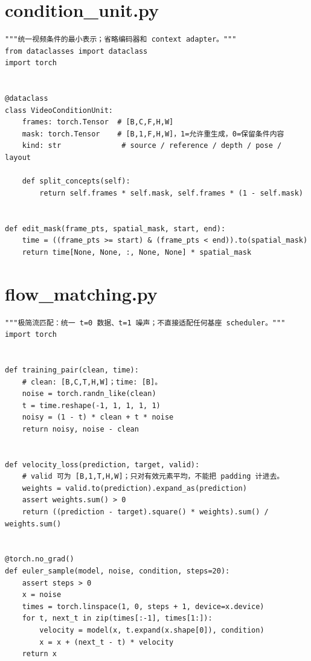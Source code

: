 \section{condition\_unit.py}
\label{code-condition-unit}
\begin{verbatim}
"""统一视频条件的最小表示；省略编码器和 context adapter。"""
from dataclasses import dataclass
import torch


@dataclass
class VideoConditionUnit:
    frames: torch.Tensor  # [B,C,F,H,W]
    mask: torch.Tensor    # [B,1,F,H,W]，1=允许重生成，0=保留条件内容
    kind: str              # source / reference / depth / pose / layout

    def split_concepts(self):
        return self.frames * self.mask, self.frames * (1 - self.mask)


def edit_mask(frame_pts, spatial_mask, start, end):
    time = ((frame_pts >= start) & (frame_pts < end)).to(spatial_mask)
    return time[None, None, :, None, None] * spatial_mask
\end{verbatim}

\section{flow\_matching.py}
\label{code-flow-matching}
\begin{verbatim}
"""极简流匹配：统一 t=0 数据、t=1 噪声；不直接适配任何基座 scheduler。"""
import torch


def training_pair(clean, time):
    # clean: [B,C,T,H,W]；time: [B]。
    noise = torch.randn_like(clean)
    t = time.reshape(-1, 1, 1, 1, 1)
    noisy = (1 - t) * clean + t * noise
    return noisy, noise - clean


def velocity_loss(prediction, target, valid):
    # valid 可为 [B,1,T,H,W]；只对有效元素平均，不能把 padding 计进去。
    weights = valid.to(prediction).expand_as(prediction)
    assert weights.sum() > 0
    return ((prediction - target).square() * weights).sum() / weights.sum()


@torch.no_grad()
def euler_sample(model, noise, condition, steps=20):
    assert steps > 0
    x = noise
    times = torch.linspace(1, 0, steps + 1, device=x.device)
    for t, next_t in zip(times[:-1], times[1:]):
        velocity = model(x, t.expand(x.shape[0]), condition)
        x = x + (next_t - t) * velocity
    return x
\end{verbatim}

